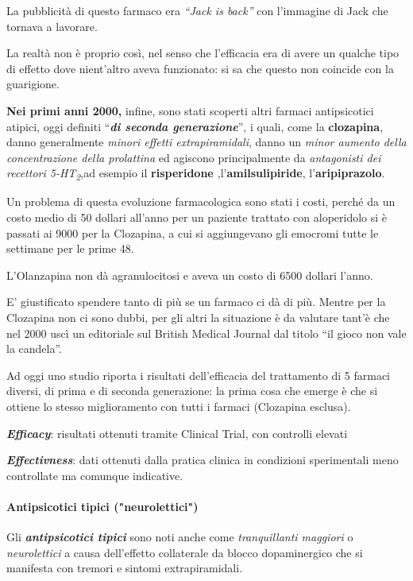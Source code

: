 La pubblicità di questo farmaco era \emph{``Jack is back''} con
l'immagine di Jack che tornava a lavorare.

La realtà non è proprio così, nel senso che l'efficacia era di avere un
qualche tipo di effetto dove nient'altro aveva funzionato: si sa che
questo non coincide con la guarigione.

\textbf{Nei primi anni 2000,} infine, sono stati scoperti altri farmaci
antipsicotici atipici, oggi definiti ``\textbf{\emph{di seconda
generazione}}'', i quali, come la \textbf{clozapina}, danno generalmente
\emph{minori effetti extrapiramidali}, danno un \emph{minor aumento
della concentrazione della prolattina} ed agiscono principalmente da
\emph{antagonisti dei recettori 5-HT\textsubscript{2}},ad esempio il
\textbf{risperidone} \emph{,}l'\textbf{amilsulipiride},
l'\textbf{aripiprazolo}.

Un problema di questa evoluzione farmacologica sono stati i costi,
perché da un costo medio di 50 dollari all'anno per un paziente trattato
con aloperidolo si è passati ai 9000 per la Clozapina, a cui si
aggiungevano gli emocromi tutte le settimane per le prime 48.

L'Olanzapina non dà agranulocitosi e aveva un costo di 6500 dollari
l'anno.

E' giustificato spendere tanto di più se un farmaco ci dà di più. Mentre
per la Clozapina non ci sono dubbi, per gli altri la situazione è da
valutare tant'è che nel 2000 uscì un editoriale sul British Medical
Journal dal titolo ``il gioco non vale la candela''.

Ad oggi uno studio riporta i risultati dell'efficacia del trattamento di
5 farmaci diversi, di prima e di seconda generazione: la prima cosa che
emerge è che si ottiene lo stesso miglioramento con tutti i farmaci
(Clozapina esclusa).

\emph{\textbf{Efficacy}}: risultati ottenuti tramite Clinical Trial, con
controlli elevati

\emph{\textbf{Effectivness}}: dati ottenuti dalla pratica clinica in
condizioni sperimentali meno controllate ma comunque indicative.

\paragraph{Antipsicotici tipici ("neurolettici")}

Gli \textbf{\emph{antipsicotici tipici}} sono noti anche come
\emph{tranquillanti maggiori} o \emph{neurolettici} a causa dell'effetto
collaterale da blocco dopaminergico che si manifesta con tremori e
sintomi extrapiramidali.

